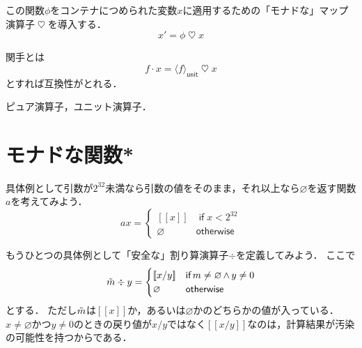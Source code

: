 \documentclass[a5paper,draft]{jsbook}
\def\[{\left[\!\left[}
\def\]{\right]\!\right]}
\newcommand{\mathBinaryOperator}[1]{\operatorname{#1}}
\newcommand{\mathAnd}{\mathBinaryOperator{\wedge}}
\newcommand{\mathKeyword}[1]{\operatorname{\textsf{#1}}}
\newcommand{\mathIf}{\mathKeyword{if}}
\newcommand{\mathOtherwise}{\mathKeyword{otherwise}}
\DeclareMathOperator{\hsklFmap}{\cdot}
\DeclareMathOperator{\hsklMonadMap}{\heartsuit}
\newcommand{\hsklNothing}{\varnothing}
\newcommand{\hsklJust}[1]{\[#1\]}
\newcommand{\hsklUnit}[1]{\langle#1\rangle_\textsf{unit}}
\newcommand{\hsklMaybe}[1]{\Tilde{#1}}
\begin{document}
この関数$\phi$をコンテナにつめられた変数$x$に適用するための「モナドな」マップ演算子$\hsklMonadMap$を導入する．
$$x'=\phi\hsklMonadMap x$$

関手とは
$$f\hsklFmap x=\hsklUnit{f}\hsklMonadMap x$$
とすれば互換性がとれる．


ピュア演算子，ユニット演算子．


\section{モナドな関数*}


具体例として引数が$2^{32}$未満なら引数の値をそのまま，それ以上なら$\hsklNothing$を返す関数$a$を考えてみよう．
\begin{equation}
ax=\begin{cases}
\hsklJust{x}&\mathIf x<2^{32}\\
\hsklNothing&\mathOtherwise
\end{cases}
\end{equation}


もうひとつの具体例として「安全な」割り算演算子$\div$を定義してみよう．
ここで
\begin{equation}
\hsklMaybe{m}\div y=\begin{cases}\hsklJust{x/y}&\mathIf m\neq\hsklNothing\mathAnd y\neq0\\
\hsklNothing&\mathOtherwise\end{cases}
\end{equation}
とする．
ただし$\hsklMaybe{m}$は$\hsklJust{x}$か，あるいは$\hsklNothing$かのどちらかの値が入っている．
$x\neq\hsklNothing$かつ$y\neq0$のときの戻り値が$x/y$ではなく$\hsklJust{x/y}$なのは，計算結果が汚染の可能性を持つからである．
\end{document}
